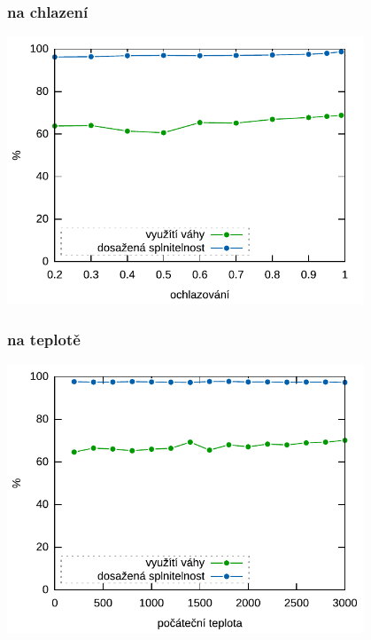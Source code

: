 \documentclass[a4paper,10pt]{article}
\begin{document}
\subsubsection*{na chlazení}
\begin{center}
\includegraphics[width=0.8\textwidth]{ochlazovani.pdf}
\end{center}
\subsubsection*{na teplotě}
\begin{center}
\includegraphics[width=0.8\textwidth]{teplota.pdf}
\end{center}
\end{document}
